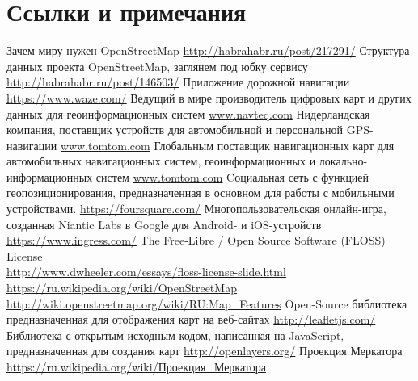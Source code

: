 \section{Ссылки и примечания}
\begin{thebibliography}{10}
     Зачем миру нужен OpenStreetMap 
        \url{http://habrahabr.ru/post/217291/}
     Структура данных проекта OpenStreetMap, заглянем под 
        юбку сервису \url{http://habrahabr.ru/post/146503/}
     Приложение дорожной навигации \url{https://www.waze.com/}
     Ведущий в мире производитель цифровых карт и других 
        данных для геоинформационных систем \url{www.navteq.com}
     Нидерландская компания, поставщик устройств для 
        автомобильной и персональной GPS-навигации \url{www.tomtom.com}
     Глобальным поставщик навигационных карт для 
        автомобильных навигационных систем, геоинформационных и 
        локально-информационных систем \url{www.tomtom.com}
     Cоциальная сеть с функцией геопозиционирования, 
        предназначенная в основном для работы с мобильными устройствами.
        \url{https://foursquare.com/}
     Многопользовательская онлайн-игра, созданная 
        Niantic Labs в Google для Android- и iOS-устройств 
        \url{https://www.ingress.com/}
     The Free-Libre / Open Source Software (FLOSS) License\\
        \url{http://www.dwheeler.com/essays/floss-license-slide.html}
     \url{https://ru.wikipedia.org/wiki/OpenStreetMap}
     \url{http://wiki.openstreetmap.org/wiki/RU:Map_Features}
     Open-Source библиотека предназначенная для отображения 
        карт на веб-сайтах \url{http://leafletjs.com/}
     Библиотека с открытым исходным кодом, написанная на 
        JavaScript, предназначенная для создания карт 
        \url{http://openlayers.org/}
     Проекция Меркатора 
        \href{https://ru.wikipedia.org/wiki/%D0%9F%D1%80%D0%BE%D0%B5%D0%BA%D1%86%D0%B8%D1%8F_%D0%9C%D0%B5%D1%80%D0%BA%D0%B0%D1%82%D0%BE%D1%80%D0%B0}
        {https://ru.wikipedia.org/wiki/Проекция\_Меркатора}
\end{thebibliography}
